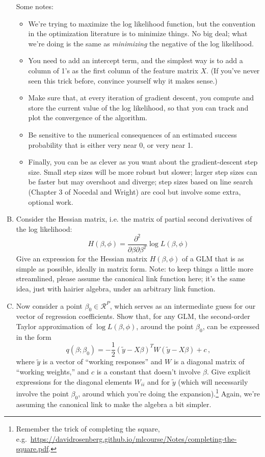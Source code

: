 \documentclass{mynotes}
\begin{document}
\begin{enumerate}[(A)]
Some notes:
\begin{itemize}
\item We're trying to maximize the log likelihood function, but the convention in the optimization literature is to minimize things.  No big deal; what we're doing is the same as \textit{minimizing} the negative of the log likelihood.  
\item You need to add an intercept term, and the simplest way is to add a column of 1's as the first column of the feature matrix $X$.  (If you've never seen this trick before, convince yourself why it makes sense.)  
\item Make sure that, at every iteration of gradient descent, you compute and store the current value of the log likelihood, so that you can track and plot the convergence of the algorithm.
\item Be sensitive to the numerical consequences of an estimated success probability that is either very near 0, or very near 1.
\item Finally, you can be as clever as you want about the gradient-descent step size.  Small step sizes will be more robust but slower; larger step sizes can be faster but may overshoot and diverge; step sizes based on line search (Chapter 3 of Nocedal and Wright) are cool but involve some extra, optional work.
\end{itemize}

\item Consider the Hessian matrix, i.e. the matrix of partial second derivatives of the log likelihood:  
$$
H(\beta, \phi) = \frac{\partial^2}{\partial \beta \partial \beta^T} \log L(\beta, \phi) 
$$
Give an expression for the Hessian matrix $H(\beta, \phi)$ of a GLM that is as simple as possible, ideally in matrix form.   Note: to keep things a little more streamlined, please assume the canonical link function here; it's the same idea, just with hairier algebra, under an arbitrary link function.  

\item Now consider a point $\beta_0 \in \mathcal{R}^P$, which serves as an intermediate guess for our vector of regression coefficients.  Show that, for any GLM, the second-order Taylor approximation of $\log L(\beta, \phi)$, around the point $\beta_0$, can be expressed in the form
$$
q(\beta; \beta_0) = -\frac{1}{2}(\tilde{y} - X \beta)^T W (\tilde{y} - X \beta) + c\, ,
$$
where $\tilde{y}$ is a vector of ``working responses'' and $W$ is a diagonal matrix of ``working weights,'' and $c$ is a constant that doesn't involve $\beta$.  Give explicit expressions for the diagonal elements $W_{ii}$ and for $\tilde{y}$ (which will necessarily involve the point $\beta_0$, around which you're doing the expansion).\footnote{Remember the trick of completing the square, e.g.~\url{https://davidrosenberg.github.io/mlcourse/Notes/completing-the-square.pdf}.} Again, we're assuming the canonical link to make the algebra a bit simpler.  


\end{enumerate}
\end{document}

